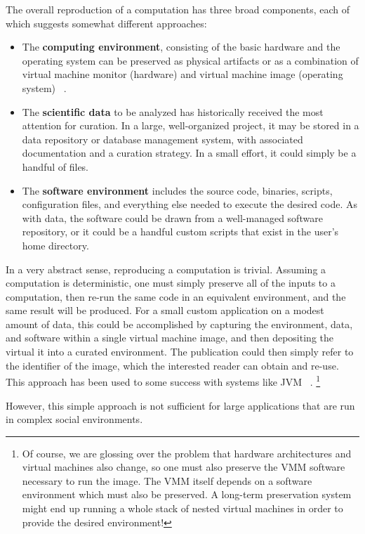 \documentclass{acm_proc_article-sp}
\begin{document}
The overall reproduction of a computation has three broad components,
each of which suggests somewhat different approaches:

\begin{itemize}
\item The {\bf computing environment}, consisting of the basic hardware and the operating system can be preserved as physical artifacts or as a combination of virtual machine monitor (hardware) and virtual machine image (operating system) ~\cite{matthews2009towards}.
\item The {\bf scientific data} to be analyzed has historically received the most attention for curation.  In a large, well-organized project, it may be stored in a  data repository or database management system, with associated documentation and a curation strategy.  In a small effort, it could simply be a handful of files.
\item The {\bf software environment} includes the source code, binaries, scripts, configuration files, and everything else needed to execute the desired code.  As with data, the software could be drawn from a well-managed software repository, or it could be a handful custom scripts that exist in the user's home directory.
\end{itemize}

In a very abstract sense, reproducing a computation is trivial.
Assuming a computation is deterministic, one must simply
preserve all of the inputs to a computation, then re-run
the same code in an equivalent environment, and the same result
will be produced.  For a small custom application on a modest
amount of data, this could be accomplished by capturing the environment,
data, and software within a single virtual machine image,
and then depositing the virtual
it into a curated environment.  The publication could
then simply refer to the identifier of the image, which the
interested reader can obtain and re-use. This approach has
been used to some success with systems like JVM ~\cite{barthe2008preservation}.
\footnote{Of course, we are glossing over the problem that hardware
architectures and virtual machines also change, so one must also
preserve the VMM software necessary to run the image.  The VMM itself
depends on a software environment which must also be preserved.
A long-term preservation system might end up running a whole
stack of nested virtual machines in order to provide the desired
environment! }

However, this simple approach is not sufficient for large applications
that are run in complex social environments.
\end{document}
